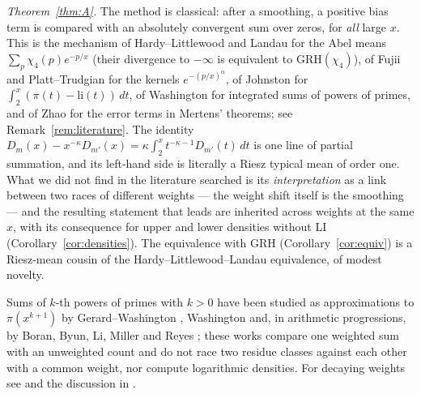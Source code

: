 \documentclass[11pt]{amsart}
\theoremstyle{definition}
\numberwithin{equation}{section}
\begin{document}
\emph{Theorem~\ref{thm:A}.} The method is classical: after a
smoothing, a positive bias term is compared with an absolutely
convergent sum over zeros, for \emph{all} large $x$. This is the
mechanism of Hardy--Littlewood and Landau \cite{HL18,Lan18} for the
Abel means $\sum_p\chi_4(p)e^{-p/x}$ (their divergence to $-\infty$ is
equivalent to GRH$(\chi_4)$), of Fujii \cite{Fuj88} and
Platt--Trudgian \cite{PT19} for the kernels $e^{-(p/x)^\alpha}$, of
Johnston \cite{Joh23} for $\int_2^x(\pi(t)-\mathrm{li}(t))\,dt$, of
Washington \cite[Theorem~3]{Was24} for integrated sums of powers of
primes, and of Zhao \cite{Zhao25} for the error terms in Mertens'
theorems; see Remark~\ref{rem:literature}. The identity
$D_m(x)-x^{-\kappa}D_{m'}(x)=\kappa\int_2^xt^{-\kappa-1}D_{m'}(t)\,dt$
is one line of partial summation, and its left-hand side is literally
a Riesz typical mean of order one. What we did not find in the
literature searched is its \emph{interpretation} as a link between two
races of different weights --- the weight shift itself is the
smoothing --- and the resulting statement that leads are inherited
across weights at the same $x$, with its consequence for upper and
lower densities without LI (Corollary~\ref{cor:densities}). The
equivalence with GRH (Corollary~\ref{cor:equiv}) is a Riesz-mean
cousin of the Hardy--Littlewood--Landau equivalence, of modest
novelty.

Sums of $k$-th powers of primes with $k>0$ have been studied as
approximations to $\pi(x^{k+1})$ by Gerard--Washington \cite{GW18},
Washington \cite{Was24} and, in arithmetic progressions, by Boran,
Byun, Li, Miller and Reyes \cite{BBLMR24}; these works compare one
weighted sum with an unweighted count and do not race two residue
classes against each other with a common weight, nor compute
logarithmic densities. For decaying weights see
\cite{AK23,Sheth24,SK25,Hay25,Aym22} and the discussion in \cite{WR}.
\end{document}
